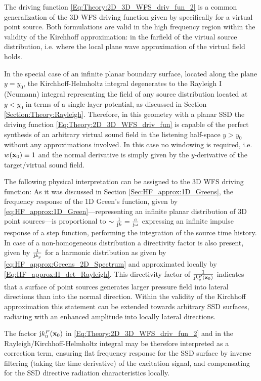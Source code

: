 The driving function \eqref{Eq:Theory:2D_3D_WFS_driv_fun_2} is a common generalization of the 3D WFS driving function given by \cite[(20)]{Zotter2013:uniqueness} specifically for a virtual point source.
Both formulations are valid in the high frequency region within the validity of the Kirchhoff approximation: in the farfield of the virtual source distribution, i.e. where the local plane wave approximation of the virtual field holds.

In the special case of an infinite planar boundary surface, located along the plane $y = y_0$, the Kirchhoff-Helmholtz integral degenerates to the Rayleigh I (Neumann) integral representing the field of any source distribution located at $y<y_0$ in terms of a single layer potential, as discussed in Section \ref{Section:Theory:Rayleigh}.
Therefore, in this geometry with a planar SSD the driving function \eqref{Eq:Theory:2D_3D_WFS_driv_fun} is capable of the perfect synthesis of an arbitrary virtual sound field in the listening half-space $y>y_0$ without any approximations involved.
In this case no windowing is required, i.e. $w(\mathbf{x}_0) \equiv 1$ and the normal derivative is simply given by the $y$-derivative of the target/virtual sound field.

\vspace{3mm}
The following physical interpretation can be assigned to the 3D WFS driving function:
As it was discussed in Section \ref{Sec:HF_approx:1D_Greens}, the frequency response of the 1D Green's function, given by \eqref{eq:HF_approx:1D_Green}---representing an infinite planar distribution of 3D point sources---is proportional to $\sim \frac{1}{\mathrm{j} k} = \frac{c}{\mathrm{j} \omega}$ expressing an infinite impulse response of a step function, performing the integration of the source time history. 
In case of a non-homogeneous distribution a directivity factor is also present, given by $\frac{1}{\mathrm{j} k_y}$ for a harmonic distribution as given by \eqref{eq:HF_approx:Greens_2D_Spectrum} and approximated locally by \eqref{Eq:HF_approx:H_det_Rayleigh}.
This directivity factor of $\frac{1}{\mathrm{j} k^P_y(\mathbf{x}_0)}$ indicates that a surface of point sources generates larger pressure field into lateral directions than into the normal direction.
Within the validity of the Kirchhoff approximation this statement can be extended towards arbitrary SSD surfaces, radiating with an enhanced amplitude into locally lateral directions.

The factor $\mathrm{j} k_{\mathrm{n}}^P(\mathbf{x}_0)$ in \eqref{Eq:Theory:2D_3D_WFS_driv_fun_2} and in the Rayleigh/Kirchhoff-Helmholtz integral may be therefore interpreted as a correction term, ensuring flat frequency response for the SSD surface by inverse filtering (taking the time derivative) of the excitation signal, and compensating for the SSD directive radiation characteristics locally.

